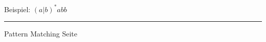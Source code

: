 
\begin{slide}{}
\normalsize

\begin{center}
Beispiel: $(a|b)^{*}abb$
\end{center}

\footnotesize
\hspace*{3.3cm} 

\vspace*{\fill}
\tiny \addtocounter{mypage}{1}
\rule{17cm}{1mm}
Pattern Matching \hspace*{\fill} Seite 
\end{slide}



